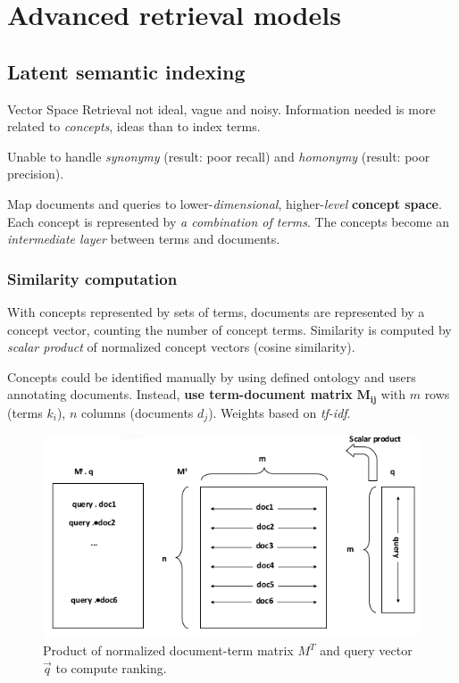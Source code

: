 \section{Advanced retrieval models}
\subsection{Latent semantic indexing}
Vector Space Retrieval not ideal, vague and noisy. Information needed is more related to \emph{concepts}, ideas than to index terms.

Unable to handle \emph{synonymy} (result: poor recall) and \emph{homonymy} (result: poor precision).

Map documents and queries to lower-\emph{dimensional}, higher-\emph{level} \textbf{concept space}. Each concept is represented by \emph{a combination of terms}. The concepts become an \emph{intermediate layer} between terms and documents.

\subsubsection{Similarity computation} With concepts represented by sets of terms, documents are represented by a concept vector, counting the number of concept terms. Similarity is computed by \emph{scalar product} of normalized concept vectors (cosine similarity).

Concepts could be identified manually by using defined ontology and users annotating documents. Instead, \textbf{use term-document matrix} $\mathbf{M_{ij}}$ with $m$ rows (terms $k_i$), $n$ columns (documents $d_j$). Weights based on \emph{tf-idf}.

\begin{figure}
  \centering
  \includegraphics[width=\linewidth]{figures/computing_ranking.png}
  \caption{Product of normalized document-term matrix $M^T$ and query vector $\vec{q}$ to compute ranking.}
  \label{fig:computing_ranking}
\end{figure}

